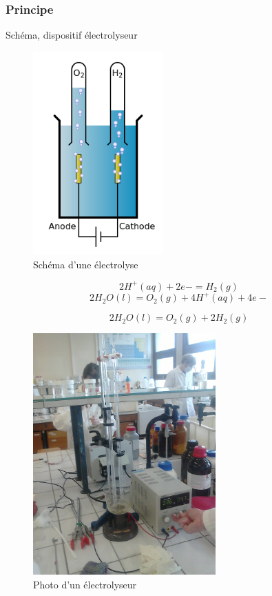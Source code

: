 \documentclass{article}%
\begin{document}
\subsubsection{Principe}

Schéma, dispositif électrolyseur

\begin{figure}
	\centerline{\includegraphics[width=5cm]{images/Schemas_electrolyse_h2o.png}}
	\caption{Schéma d'une électrolyse}
\end{figure}

\[2 H^+(aq) + 2e- = H_2(g)\]
\[2 H_2O(l)  = O_2(g) + 4 H^+(aq) + 4 e-\]

\[2 H_2 O(l) = O_2(g)+2 H_2(g)\]

\begin{figure}
	\centerline{\includegraphics[width=7cm]{images/electrolyse_eau.jpg}}
	\caption{Photo d'un électrolyseur}
\end{figure}
\end{document}
